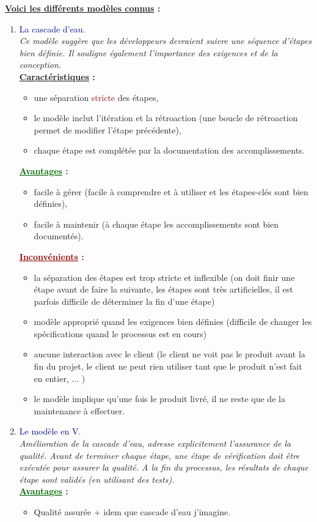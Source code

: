 \documentclass{article}
\newcommand{\gre}[1]{\textcolor{darkgreen}{#1}}
\newcommand{\blu}[1]{\textcolor{darkblue}{#1}}
\newcommand{\rouge}[1]{\textcolor{darkred}{#1}}
\begin{document}
\begin{sffamily}
\noindent \textbf{\underline{Voici les différents modèles connus} :}
\begin{enumerate}
\item \blu{La cascade d'eau}.\\
\textit{Ce modèle suggère que les développeurs devraient suivre une séquence d'étapes bien définie. Il souligne également 
l'importance des exigences et de la conception.} \\
\textbf{\underline{Caractéristiques} :}
	\begin{itemize}
	\item une séparation \rouge{stricte} des étapes,
	\item le modèle inclut l'itération et la rétroaction (une boucle de rétroaction permet de modifier l'étape précédente),
	\item chaque étape est complétée par la documentation des accomplissements.
	\end{itemize}
\gre{\textbf{\underline{Avantages} :}}
	\begin{itemize}
	\item facile à gérer (facile à comprendre et à utiliser et les étapes-clés sont bien définies),
	\item facile à maintenir (à chaque étape les accomplissements sont bien documentés).
	\end{itemize}
\rouge{\textbf{\underline{Inconvénients} :}}
	\begin{itemize}
	\item la séparation des étapes est trop stricte et inflexible (on doit finir une étape avant de faire la suivante, les 
	étapes sont très artificielles, il est parfois difficile de déterminer la fin d'une étape)
	\item modèle approprié quand les exigences bien définies (difficile de changer les spécifications quand le processus est en 
	cours)
	\item aucune interaction avec le client (le client ne voit pas le produit avant la fin du projet, le client ne peut rien 
	utiliser tant que le produit n'est fait en entier, ... )
	\item le modèle implique qu'une fois le produit livré, il ne reste que de la maintenance à effectuer.
	\end{itemize}
	
\item \blu{Le modèle en V}.\\
\textit{Amélioration de la cascade d'eau, adresse explicitement l'assurance de la qualité. Avant de terminer chaque étape, une
étape de vérification doit être exécutée pour assurer la qualité. A la fin du processus, les résultats de chaque étape sont 
validés (en utilisant des tests).} \\
\gre{\textbf{\underline{Avantages} :}}
	\begin{itemize}
	\item Qualité assurée + idem que cascade d'eau j'imagine.
	\end{itemize}


\end{enumerate}
\end{sffamily}
\end{document}
